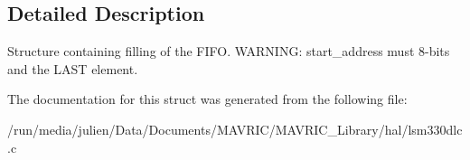 \subsection{Detailed Description}
Structure containing filling of the F\+I\+F\+O. W\+A\+R\+N\+I\+N\+G\+: start\+\_\+address must 8-\/bits and the L\+A\+S\+T element. 

The documentation for this struct was generated from the following file\+:\begin{DoxyCompactItemize}
\item 
/run/media/julien/\+Data/\+Documents/\+M\+A\+V\+R\+I\+C/\+M\+A\+V\+R\+I\+C\+\_\+\+Library/hal/lsm330dlc.\+c\end{DoxyCompactItemize}
